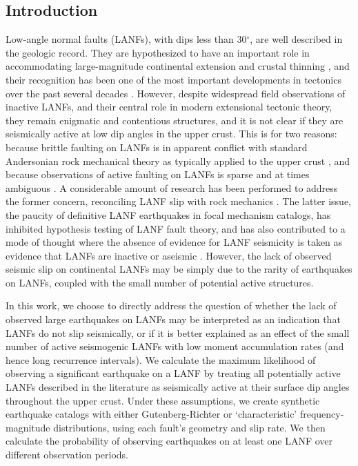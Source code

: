\documentclass[twocolumn,grl]{AGUTeX}
\begin{document}
\begin{article}

\section{Introduction}
Low-angle normal faults (LANFs), with dips less than 30$^\circ$, are
well described in the geologic record. They are hypothesized to have
an important role in accommodating large-magnitude continental
extension \citep{howard1987crustal} and crustal thinning
\citep{lister1986detachment}, and their recognition has been one of
the most important developments in tectonics over the past several
decades \citep{wernicke2009detachment}. However, despite widespread
field observations of inactive LANFs, and their central role in modern
extensional tectonic theory, they remain enigmatic and contentious
structures, and it is not clear if they are seismically active at low dip 
angles in the upper crust. This is for two reasons: because brittle faulting
on LANFs is in apparent conflict with standard Andersonian rock mechanical
theory as typically applied to the upper crust
\citep{axen2004lanfmech}, and because observations of active faulting
on LANFs is sparse and at times ambiguous \citep{wernicke1995seis}. A
considerable amount of research has been performed to address the
former concern, reconciling LANF slip with rock mechanics \citep [e.g.,]
[]{axenbartley1997, collettini2011lanfmech}. The latter issue, the paucity of 
definitive LANF earthquakes in focal mechanism catalogs, has inhibited
hypothesis testing of LANF fault theory, and has also contributed to a mode
of thought where the  absence of evidence for LANF seismicity is taken
as evidence that LANFs are inactive or aseismic \citep{jackson1987,
collettinisibson2001}. However, the lack of observed seismic slip on
continental LANFs may be simply due to the rarity of earthquakes on
LANFs, coupled with the small number of potential active structures.

In this work, we choose to directly address the question of whether
the lack of observed large earthquakes on LANFs may be 
interpreted as an indication that
LANFs do not slip seismically, or if it is better explained as an
effect of the small number of active seismogenic LANFs with low moment
accumulation rates (and hence long recurrence intervals). 
We calculate the maximum likelihood of observing a significant
earthquake on a LANF by treating all potentially active LANFs described in the 
literature as seismically active at their surface dip angles 
throughout the upper crust. %
Under these assumptions, we create synthetic earthquake catalogs with
either Gutenberg-Richter or `characteristic' frequency-magnitude distributions, 
using each fault's geometry and slip rate. We then calculate the
probability of observing earthquakes on at least one LANF over different
observation periods.


\end{article}
\end{document}
